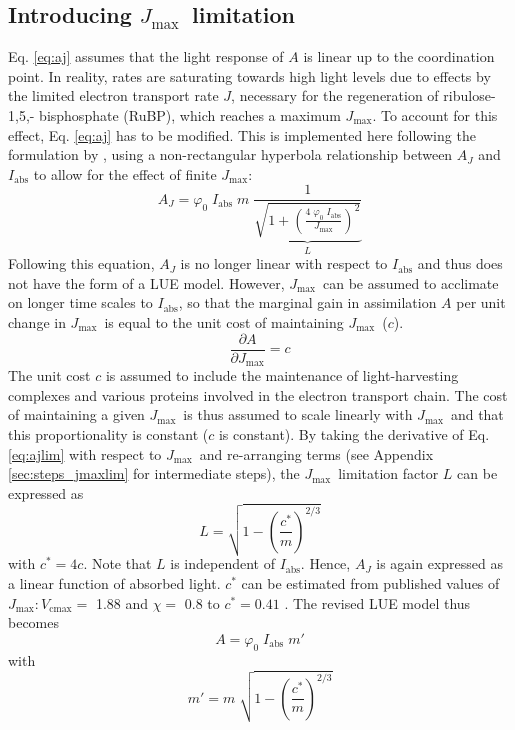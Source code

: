 \documentclass{myreport}
\newcommand{\vcmax}{$V_{\text{cmax}}$}
\newcommand{\jmax}{$J_{\text{max}}$}
\begin{document}
\subsection{Introducing \jmax\ limitation}
\label{sec:jmax}
Eq. \ref{eq:aj} assumes that the light response of $A$ is linear up to the coordination point. In reality, rates are saturating towards high light levels due to effects by the limited electron transport rate $J$, necessary for the regeneration of ribulose-1,5,- bisphosphate (RuBP), which reaches a maximum \jmax . To account for this effect, Eq. \ref{eq:aj} has to be modified. This is implemented here following the formulation by \citet{smith37}, using a non-rectangular hyperbola relationship between $A_J$ and $I_{\mathrm{abs}}$ to allow for the effect of finite $J_{\mathrm{max}}$:
\begin{equation}
\label{eq:ajlim}
    A_J = \varphi_0 \; I_{\mathrm{abs}} \; m \; \underbrace{ \frac{1}{\sqrt{1+ \left( \frac{4\;\varphi_0\;I_{\mathrm{abs}}}{J_{\mathrm{max}}} \right)^{2}}} }_{L}
\end{equation}
Following this equation, $A_J$ is no longer linear with respect to $I_{\mathrm{abs}}$ and thus does not have the form of a LUE model. However, \jmax\ can be assumed to acclimate on longer time scales to $I_{\mathrm{abs}}$, so that the marginal gain in assimilation $A$ per unit change in \jmax\ is equal to the unit cost of maintaining \jmax\ ($c$).
\begin{equation}
\label{eq:jmaxpartial}
    \frac{\partial A}{\partial J_{\mathrm{max}}} = c 
\end{equation}
The unit cost $c$ is assumed to include the maintenance of light-harvesting complexes and various proteins involved in the electron transport chain. The cost of maintaining a given \jmax\ is thus assumed to scale linearly with \jmax\ and that this proportionality is constant ($c$ is constant). By taking the derivative of Eq. \ref{eq:ajlim} with respect to \jmax\ and re-arranging terms (see Appendix \ref{sec:steps_jmaxlim} for intermediate steps), the \jmax\ limitation factor $L$ can be expressed as
\begin{equation}
\label{eq:factor_jmaxlim}
    L = \sqrt{ 1 - \left( \frac{c^\ast}{m} \right)^{2/3} }
\end{equation}
with $c^\ast = 4c$. Note that $L$ is independent of $I_\text{abs}$. Hence, $A_J$ is again expressed as a linear function of absorbed light. $c^\ast$ can be estimated from published values of \jmax $:$\vcmax $=$ 1.88 \citep{kattge07} and $\chi =$ 0.8 \citep{lloyd94} to $c^\ast = 0.41$ \citep{wang17natpl}. The revised LUE model thus becomes
\begin{equation}
\label{eq:ajlim4}
    A = \varphi_0 \; I_{\mathrm{abs}} \; m'
\end{equation}
with
\begin{equation}
\label{eq:mprime}
    m' = m \; \sqrt{1 - \left( \frac{c^\ast}{m} \right)^{2/3} }
\end{equation}
\end{document}
